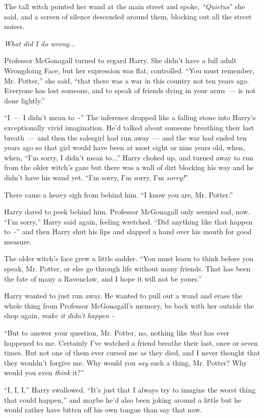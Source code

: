 The tall witch pointed her wand at the main street and spoke, \emph{``Quietus}'' she said, and a screen of silence descended around them, blocking out all the street noises.

\emph{What did I do wrong...}

Professor McGonagall turned to regard Harry. She didn't have a full adult Wrongdoing Face, but her expression was flat, controlled. ``You must remember, Mr. Potter,'' she said, ``that there was a war in this country not ten years ago. Everyone has lost someone, and to speak of friends dying in your arms~--- is not done lightly.''

``I~--- I didn't mean to~-'' The inference dropped like a falling stone into Harry's exceptionally vivid imagination. He'd talked about someone breathing their last breath~--- and then the salesgirl had run away~--- and the war had ended ten years ago so that girl would have been at most eight or nine years old, when, when, ``I'm sorry, I didn't mean to...'' Harry choked up, and turned away to run from the older witch's gaze but there was a wall of dirt blocking his way and he didn't have his wand yet. ``I'm sorry, I'm sorry, I'm \emph{sorry!}''

There came a heavy sigh from behind him. ``I know you are, Mr. Potter.''

Harry dared to peek behind him. Professor McGonagall only seemed sad, now. ``I'm sorry,'' Harry said again, feeling wretched. ``Did anything like that happen to~-'' and then Harry shut his lips and slapped a hand over his mouth for good measure.

The older witch's face grew a little sadder. ``You must learn to think before you speak, Mr. Potter, or else go through life without many friends. That has been the fate of many a Ravenclaw, and I hope it will not be yours.''

Harry wanted to just run away. He wanted to pull out a wand and erase the whole thing from Professor McGonagall's memory, be back with her outside the shop again, \emph{make it didn't happen -}

``But to answer your question, Mr. Potter, no, nothing like \emph{that} has ever happened to me. Certainly I've watched a friend breathe their last, once or seven times. But not one of them ever cursed me as they died, and I never thought that they wouldn't forgive me. Why would you \emph{say} such a thing, Mr. Potter? Why would you even \emph{think} it?''

``I, I, I,'' Harry swallowed. ``It's just that I always try to imagine the worst thing that could happen,'' and maybe he'd also been joking around a little but he would rather have bitten off his own tongue than say that now.

